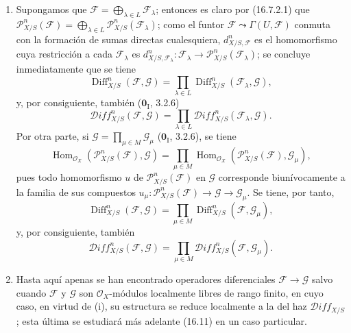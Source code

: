 \begin{remarks}[16.8.11]
\label{IV.16.8.11}
\begin{enumerate}
  \item[(i)] Supongamos que
  $\mathscr{F}=\bigoplus_{\lambda\in L}\mathscr{F}_\lambda$; entonces es
  claro por (16.7.2.1) que
  $\mathscr{P}_{X/S}^n(\mathscr{F})=
  \bigoplus_{\lambda\in L}\mathscr{P}_{X/S}^n(\mathscr{F}_\lambda)$; como el
  funtor $\mathscr{F}\leadsto\Gamma(U,\mathscr{F})$ conmuta con la formación
  de sumas directas cualesquiera, $d_{X/S,\mathscr{F}}^n$ es el homomorfismo
  cuya restricción a cada $\mathscr{F}_\lambda$ es
  $d_{X/S,\mathscr{F}_\lambda}^n:\mathscr{F}_\lambda\to\mathscr{P}_{X/S}^n(\mathscr{F}_\lambda)$;
  se concluye inmediatamente que se tiene
  \[
    \operatorname{Diff}_{X/S}^n(\mathscr{F},\mathscr{G})
    =\prod_{\lambda\in L}
    \operatorname{Diff}_{X/S}^n(\mathscr{F}_\lambda,\mathscr{G}),
  \]
  y, por consiguiente, también ($\mathbf{0}_{\mathrm I}$, 3.2.6)
  \[
    \mathscr{D}\!iff_{X/S}^n(\mathscr{F},\mathscr{G})
    =\prod_{\lambda\in L}
    \mathscr{D}\!iff_{X/S}^n(\mathscr{F}_\lambda,\mathscr{G}).
  \]
  Por otra parte, si $\mathscr{G}=\prod_{\mu\in M}\mathscr{G}_\mu$
  ($\mathbf{0}_{\mathrm I}$, 3.2.6), se tiene
  \[
    \operatorname{Hom}_{\mathcal{O}_X}
    (\mathscr{P}_{X/S}^n(\mathscr{F}),\mathscr{G})
    =\prod_{\mu\in M}\operatorname{Hom}_{\mathcal{O}_X}
    (\mathscr{P}_{X/S}^n(\mathscr{F}),\mathscr{G}_\mu),
  \]
  pues todo homomorfismo $u$ de $\mathscr{P}_{X/S}^n(\mathscr{F})$ en
  $\mathscr{G}$ corresponde biunívocamente a la familia de sus compuestos
  $u_\mu:\mathscr{P}_{X/S}^n(\mathscr{F})\to\mathscr{G}\to\mathscr{G}_\mu$.
  Se tiene, por tanto,
  \[
    \operatorname{Diff}_{X/S}^n(\mathscr{F},\mathscr{G})
    =\prod_{\mu\in M}
    \operatorname{Diff}_{X/S}^n(\mathscr{F},\mathscr{G}_\mu),
  \]
  y, por consiguiente, también
  \[
    \mathscr{D}\!iff_{X/S}^n(\mathscr{F},\mathscr{G})
    =\prod_{\mu\in M}
    \mathscr{D}\!iff_{X/S}^n(\mathscr{F},\mathscr{G}_\mu).
  \]
  \item[(ii)] Hasta aquí apenas se han encontrado operadores diferenciales
  $\mathscr{F}\to\mathscr{G}$ salvo cuando $\mathscr{F}$ y $\mathscr{G}$ son
  $\mathcal{O}_X$-módulos localmente libres de rango finito, en cuyo caso, en
  virtud de (i), su estructura se reduce localmente a la del haz
  $\mathscr{D}\!iff_{X/S}$; esta última se estudiará más adelante (16.11) en
  un caso particular.
\end{enumerate}
\end{remarks}
